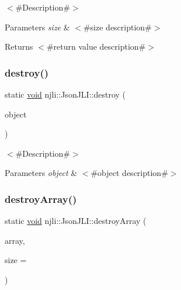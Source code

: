 $<$\#\+Description\#$>$


\begin{DoxyParams}{Parameters}
{\em size} & $<$\#size description\#$>$\\
\hline
\end{DoxyParams}
\begin{DoxyReturn}{Returns}
$<$\#return value description\#$>$ 
\end{DoxyReturn}
\mbox{\label{classnjli_1_1_json_j_l_i_aafaa3944f09a731934e5862c4fdea495}} 
\subsubsection{\texorpdfstring{destroy()}{destroy()}}
{\footnotesize\ttfamily static \mbox{\hyperlink{_thread_8h_af1e856da2e658414cb2456cb6f7ebc66}{void}} njli\+::\+Json\+J\+L\+I\+::destroy (\begin{DoxyParamCaption}\item[{\mbox{\hyperlink{classnjli_1_1_json_j_l_i}{Json\+J\+LI}} $\ast$}]{object }\end{DoxyParamCaption})\hspace{0.3cm}{\ttfamily [static]}}

$<$\#\+Description\#$>$


\begin{DoxyParams}{Parameters}
{\em object} & $<$\#object description\#$>$ \\
\hline
\end{DoxyParams}
\mbox{\label{classnjli_1_1_json_j_l_i_aaca6b11677ffe08cd79ec975e4af8919}} 
\subsubsection{\texorpdfstring{destroy\+Array()}{destroyArray()}}
{\footnotesize\ttfamily static \mbox{\hyperlink{_thread_8h_af1e856da2e658414cb2456cb6f7ebc66}{void}} njli\+::\+Json\+J\+L\+I\+::destroy\+Array (\begin{DoxyParamCaption}\item[{\mbox{\hyperlink{classnjli_1_1_json_j_l_i}{Json\+J\+LI}} $\ast$$\ast$}]{array,  }\item[{const \mbox{\hyperlink{_util_8h_a10e94b422ef0c20dcdec20d31a1f5049}{u32}}}]{size = {} }\end{DoxyParamCaption})\hspace{0.3cm}{\ttfamily [static]}}

